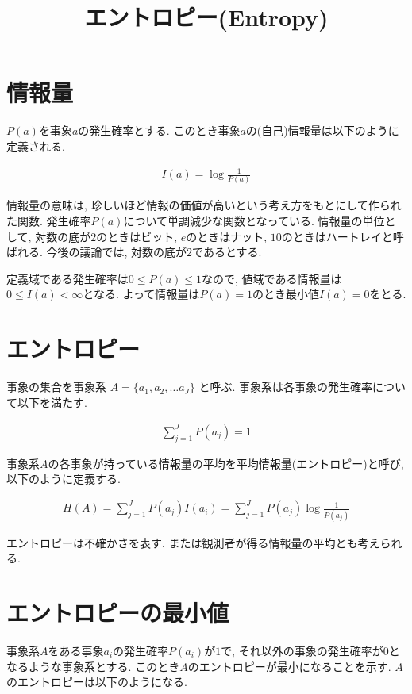 \documentclass[dvipdfmx, 10pt]{jsarticle}
\title{\textbf{エントロピー(Entropy)}}
\author{}
\date{}
\begin{document}
\maketitle

\section*{情報量}
\(P(a)\)を事象\(a\)の発生確率とする. このとき事象\(a\)の(自己)情報量は以下のように定義される. 

\begin{align*}
    I(a) = \log \frac{1}{P(a)}
\end{align*}

情報量の意味は, 珍しいほど情報の価値が高いという考え方をもとにして作られた関数. 
発生確率\(P(a)\)について単調減少な関数となっている. 
情報量の単位として, 対数の底が\(2\)のときはビット, \(e\)のときはナット, \(10\)のときはハートレイと呼ばれる. 
今後の議論では, 対数の底が\(2\)であるとする. 

定義域である発生確率は\(0 \leq P(a) \leq 1\)なので, 値域である情報量は\(0 \leq I(a) < \infty\)となる. 
よって情報量は\(P(a) = 1\)のとき最小値\(I(a) = 0\)をとる. 

\section*{エントロピー}
事象の集合を事象系 \(A = \{a_1, a_2, \dots a_J\}\) と呼ぶ. 事象系は各事象の発生確率について以下を満たす. 

\begin{align*}
    \sum_{j=1}^{J} P(a_j) = 1
\end{align*}

事象系\(A\)の各事象が持っている情報量の平均を平均情報量(エントロピー)と呼び, 以下のように定義する. 

\begin{align*}
    H(A) = \sum_{j=1}^{J} P(a_j) I(a_i) = \sum_{j=1}^{J} P(a_j) \log \frac{1}{P(a_j)}
\end{align*}

エントロピーは不確かさを表す. または観測者が得る情報量の平均とも考えられる. 

\section*{エントロピーの最小値}
事象系\(A\)をある事象\(a_i\)の発生確率\(P(a_i)\)が\(1\)で, それ以外の事象の発生確率が\(0\)となるような事象系とする. 
このとき\(A\)のエントロピーが最小になることを示す. \(A\)のエントロピーは以下のようになる. 
\end{document}
